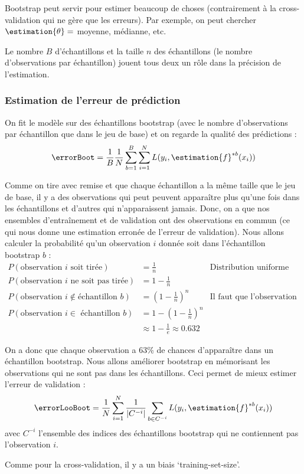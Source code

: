         Bootstrap peut servir pour estimer beaucoup de choses (contrairement à la cross-validation qui ne gère que les erreurs). Par exemple, on peut chercher \(\estimation{\theta} = \) moyenne, médianne, etc.

        Le nombre \(B\) d'échantillons et la taille \(n\) des échantillons (le nombre d'observations par échantillon) jouent tous deux un rôle dans la précision de l'estimation.

        \subsubsection{Estimation de l'erreur de prédiction}
            On fit le modèle sur des échantillons bootstrap (avec le nombre d'observations par échantillon que dans le jeu de base) et on regarde la qualité des prédictions :
            \[
                \errorBoot = \frac{1}{B}\frac{1}{N} \sum_{b=1}^B \sum_{i=1}^N L(y_i, \estimation{f}^{*b}(x_i))
            \]

            Comme on tire avec remise et que chaque échantillon a la même taille que le jeu de base, il y a des observations qui peut peuvent apparaître plus qu'une fois dans les échantillons et d'autres qui n'apparaissent jamais. Donc, on a que nos ensembles d'entraînement et de validation ont des observations en commun (ce qui nous donne une estimation erronée de l'erreur de validation). Nous allons calculer la probabilité qu'un observation \(i\) donnée soit dans l'échantillon bootstrap \(b\) :
            \begin{align*}
                P(\text{observation \(i\) soit tirée}) &= \frac{1}{n} & \text{Distribution uniforme}\\
                P(\text{observation \(i\) ne soit pas tirée}) &= 1 - \frac{1}{n}\\
                P(\text{observation } i \not\in \text{échantillon } b) &= (1 - \frac{1}{n})^n & \text{Il faut que l'observation ne soit jamais tirée}\\
                P(\text{observation \(i \in\) échantillon \(b\)}) &= 1 - (1 - \frac{1}{n})^n \\
                &\approx 1 - \frac{1}{e} \approx 0.632
            \end{align*}

            On a donc que chaque observation a 63\% de chances d'apparaître dans un échantillon bootstrap. Nous allons améliorer bootstrap en mémorisant les observations qui ne sont pas dans les échantillons. Ceci permet de mieux estimer l'erreur de validation :
            \[
                \errorLooBoot = \frac{1}{N} \sum_{i=1}^N \frac{1}{|C^{-i}|} \sum_{b \in C^{-i}} L(y_i, \estimation{f}^{*b} (x_i))
            \]
            avec \(C^{-i}\) l'ensemble des indices des échantillons bootstrap qui ne contiennent pas l'observation \(i\).

            Comme pour la cross-validation, il y a un biais `training-set-size'.